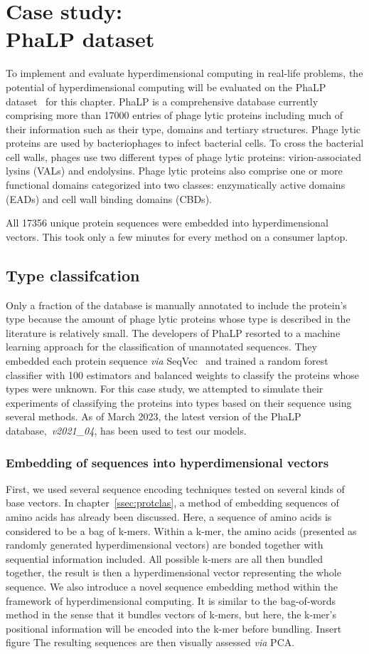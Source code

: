 \chapter{Case study:\\PhaLP dataset}
To implement and evaluate hyperdimensional computing in real-life problems, the potential of hyperdimensional computing will be evaluated on the PhaLP dataset~\cite{phalp} for this chapter. PhaLP is a comprehensive database currently comprising more than 17000 entries of phage lytic proteins including much of their information such as their type, domains and tertiary structures. Phage lytic proteins are used by bacteriophages to infect bacterial cells. To cross the bacterial cell walls, phages use two different types of phage lytic proteins: virion-associated lysins (VALs) and endolysins. Phage lytic proteins also comprise one or more functional domains categorized into two classes: enzymatically active domains (EADs) and cell wall binding domains (CBDs).

All 17356 unique protein sequences were embedded into hyperdimensional vectors. This took only a few minutes for every method on a consumer laptop.

\section{Type classifcation}
Only a fraction of the database is manually annotated to include the protein's type because the amount of phage lytic proteins whose type is described in the literature is relatively small. The developers of PhaLP resorted to a machine learning approach for the classification of unannotated sequences. They embedded each protein sequence \textit{via} SeqVec~\cite{seqvec} and trained a random forest classifier with 100 estimators and balanced weights to classify the proteins whose types were unknown. For this case study, we attempted to simulate their experiments of classifying the proteins into types based on their sequence using several methods. As of March 2023, the latest version of the PhaLP database,~\textit{v2021\_04}, has been used to test our models.
\subsection*{Embedding of sequences into hyperdimensional vectors}
First, we used several sequence encoding techniques tested on several kinds of base vectors. In chapter~\ref{ssec:protclas}, a method of embedding sequences of amino acids has already been discussed. Here, a sequence of amino acids is considered to be a bag of k-mers. Within a k-mer, the amino acids (presented as randomly generated hyperdimensional vectors) are bonded together with sequential information included. All possible k-mers are all then bundled together, the result is then a hyperdimensional vector representing the whole sequence. We also introduce a novel sequence embedding method within the framework of hyperdimensional computing. It is similar to the bag-of-words method in the sense that it bundles vectors of k-mers, but here, the k-mer's positional information will be encoded into the k-mer before bundling. Insert figure The resulting sequences are then visually assessed \textit{via} PCA.

